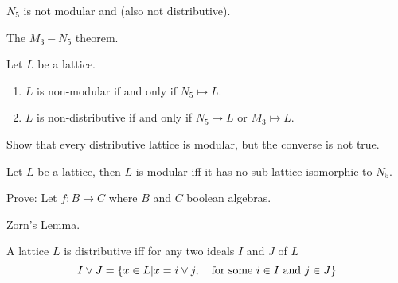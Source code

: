\documentclass[12pt]{article}
\begin{document}
\begin{prob}
    \(N_5\) is not modular and (also not distributive).
\end{prob}
\begin{prob}
    The \(M_3-N_5\) theorem.
\end{prob}
\begin{soln}
    \begin{thm}
        Let \(L\) be a lattice.
        \begin{enumerate}[label=(\roman*)]
            \item \(L\) is non-modular if and only if \(N_5 \mapsto L\).
            \item \(L\) is non-distributive if and only if \(N_5 \mapsto L\) or \(M_3 \mapsto L\).
        \end{enumerate}
    \end{thm}
\end{soln}
\begin{prob}
    Show that every distributive lattice is modular, but the converse is not true.
\end{prob}
\begin{prob}
    Let \(L\) be a lattice, then \(L\) is modular iff it has no sub-lattice isomorphic to \(N_5\).
\end{prob}
\begin{prob}
    Prove: Let \(f:B\to C\) where \(B\) and \(C\) boolean algebras.
\end{prob}
\begin{prob}
    Zorn's Lemma.
\end{prob}
\begin{prob}
    A lattice \(L\) is distributive iff for any two ideals \(I\) and \(J\) of \(L\)
    \[I\vee J=\left\{x\in L|x=i\vee j, \quad\text{for some } i\in I\text{ and }j\in J\right\}\]
\end{prob}
\end{document}
